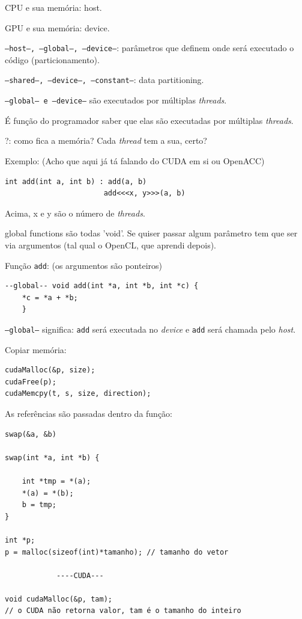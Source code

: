 \documentclass[12pt]{report} %
\begin{document}
CPU e sua memória: host.

GPU e sua memória: device.

\texttt{--host--, --global--, --device--}: parâmetros que definem onde será executado o código (particionamento).

\texttt{--shared--, --device--, --constant--}: data partitioning.

\texttt{--global-- e --device--} são executados por múltiplas \textit{threads}.

É função do programador saber que elas são executadas por múltiplas \textit{threads}.

?: como fica a memória? Cada \textit{thread} tem a sua, certo?

Exemplo: (Acho que aqui já tá falando do CUDA em si ou OpenACC)

\begin{verbatim}
int add(int a, int b) : add(a, b)
					   add<<<x, y>>>(a, b)
\end{verbatim}
Acima, x e y são o número de \textit{threads}.

global functions são todas 'void'. Se quiser passar algum parâmetro tem que 
ser via argumentos (tal qual o OpenCL, que aprendi depois).

Função \texttt{add}: (os argumentos são ponteiros)
\begin{verbatim}
--global-- void add(int *a, int *b, int *c) {
	*c = *a + *b;
	}
\end{verbatim}

\texttt{--global--} significa: \texttt{add} será executada no \textit{device} e 
\texttt{add} será chamada pelo \textit{host}.

Copiar memória:
\begin{verbatim}
cudaMalloc(&p, size);
cudaFree(p);
cudaMemcpy(t, s, size, direction);
\end{verbatim}

As referências são passadas dentro da função:

\begin{verbatim}
swap(&a, &b)

swap(int *a, int *b) {
	
	int *tmp = *(a);
	*(a) = *(b);
	b = tmp;
}

int *p;
p = malloc(sizeof(int)*tamanho); // tamanho do vetor

            ----CUDA---
            
void cudaMalloc(&p, tam); 
// o CUDA não retorna valor, tam é o tamanho do inteiro
\end{verbatim}
\end{document}
